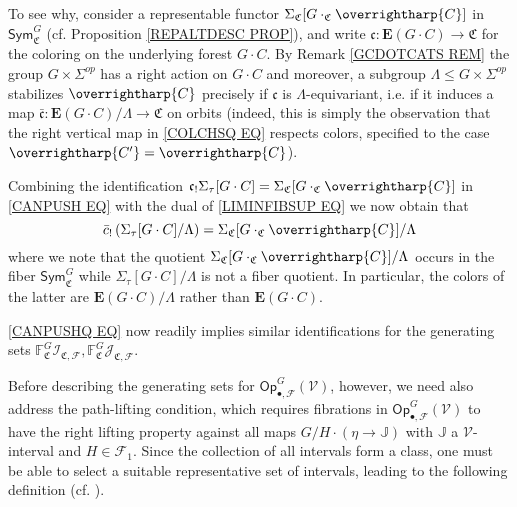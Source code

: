 \documentclass[a4paper,10pt
,draft
]{article}%
\numberwithin{equation}{section}
\numberwithin{figure}{section}
\theoremstyle{definition} %
\newcommand{\vect}[1]{\text{\overrightharp{\ensuremath{#1}}}}
\newcommand{\F}{\ensuremath{\mathcal F}}
\newcommand{\V}{\ensuremath{\mathcal V}}
\newcommand{\1}{\ensuremath{\mathbbm 1}}%
\begin{document}
To see why, 
consider a representable functor
$\Sigma_{\mathfrak{C}}[G \cdot_{\mathfrak{C}} \vect{C}]$
in
$\mathsf{Sym}^G_{\mathfrak{C}}$
(cf. Proposition \ref{REPALTDESC PROP}),
and write
$\mathfrak{c} \colon 
\boldsymbol{E}(G \cdot C) \to \mathfrak{C}$
for the coloring on the underlying forest $G \cdot C$.
By Remark \ref{GCDOTCATS REM}
the group $G \times \Sigma^{op}$
has a right action on $G \cdot C$
and moreover, a subgroup
$\Lambda \leq G \times \Sigma^{op}$ stabilizes $\vect{C}$
precisely if $\mathfrak{c}$ is $\Lambda$-equivariant,
i.e. if it induces a map 
$\bar{\mathfrak{c}} \colon 
\boldsymbol{E}(G \cdot C)/\Lambda \to \mathfrak{C}$
on orbits
(indeed, this is simply the observation that the right vertical map in 
\eqref{COLCHSQ EQ} respects colors, specified to the case
$\vect{C'} = \vect{C}$).


Combining the identification
$\mathfrak{c}_! \Sigma_{\tau}[G \cdot C]
=
\Sigma_{\mathfrak{C}}[G \cdot_{\mathfrak{C}} \vect{C}]$
in 
\eqref{CANPUSH EQ}
with the dual of
\eqref{LIMINFIBSUP EQ}
we now obtain that
\begin{equation}\label{CANPUSHQ EQ}
\bar{c}_{!} 
\left(
\Sigma_{\tau}[G \cdot C]/\Lambda
\right)
=
\Sigma_{\mathfrak{C}}[G \cdot_{\mathfrak{C}} \vect{C}]/\Lambda
\end{equation}
where we note that the quotient
$\Sigma_{\mathfrak{C}}[G \cdot_{\mathfrak{C}} \vect{C}]/\Lambda$
occurs in the fiber $\mathsf{Sym}^G_{\mathfrak{C}}$
while $\Sigma_{\tau}[G \cdot C]/\Lambda$
is not a fiber quotient.
In particular, the colors of the latter are
$\boldsymbol{E}(G \cdot C)/\Lambda$
rather than $\boldsymbol{E}(G \cdot C)$.

\eqref{CANPUSHQ EQ} now readily implies similar identifications for the generating sets
$\mathbb{F}^G_{\mathfrak{C}} \mathcal{I}_{\mathfrak{C},\mathcal{F}},
\mathbb{F}^G_{\mathfrak{C}} \mathcal{J}_{\mathfrak{C},\mathcal{F}}$.




Before describing the generating sets for 
$\mathsf{Op}^G_{\bullet,\mathcal{F}}(\V)$, however,
we need also address the path-lifting condition, which requires
fibrations in $\mathsf{Op}^G_{\bullet,\F}(\V)$ to have the right lifting property against all maps 
$G/H \cdot (\eta \to \mathbb J)$
with $\mathbb{J}$ a $\V$-interval and $H \in \F_1$.
Since the collection of all intervals form a class, one must be able to select a suitable representative set of intervals, leading to the following definition (cf. \cite{BM13}).
\end{document}
